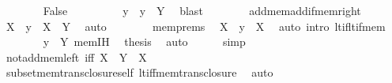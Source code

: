 \begin{isabellebody}
\ \ \ \ \ \ \isamarkupfalse%
\ False\isanewline
\ \ \ \ \ \ \isamarkupfalse%
\ \isamarkupfalse%
\ y\ \ {\isachardoublequoteopen}y\ {\isasymin}\ Y{\isachardoublequoteclose}\ \isamarkupfalse%
\ blast\isanewline
\ \ \ \ \ \ \isamarkupfalse%
\ add{\isacharunderscore}{\kern0pt}mem{\isacharunderscore}{\kern0pt}add{\isacharunderscore}{\kern0pt}if{\isacharunderscore}{\kern0pt}mem{\isacharunderscore}{\kern0pt}right\ \isamarkupfalse%
\ {\isachardoublequoteopen}X\ {\isacharplus}{\kern0pt}\ y\ {\isasymin}\ X\ {\isacharplus}{\kern0pt}\ Y{\isachardoublequoteclose}\ \isamarkupfalse%
\ auto\isanewline
\ \ \ \ \ \ \isamarkupfalse%
\ mem{\isachardot}{\kern0pt}prems\ \isamarkupfalse%
\ {\isachardoublequoteopen}X\ {\isacharplus}{\kern0pt}\ y\ {\isacharless}{\kern0pt}\ X{\isachardoublequoteclose}\ \isamarkupfalse%
\ {\isacharparenleft}{\kern0pt}auto\ intro{\isacharcolon}{\kern0pt}\ lt{\isacharunderscore}{\kern0pt}if{\isacharunderscore}{\kern0pt}lt{\isacharunderscore}{\kern0pt}if{\isacharunderscore}{\kern0pt}mem{\isacharparenright}{\kern0pt}\isanewline
\ \ \ \ \ \ \isamarkupfalse%
\ {\isacartoucheopen}y\ {\isasymin}\ Y{\isacartoucheclose}\ mem{\isachardot}{\kern0pt}IH\ \isamarkupfalse%
\ {\isacharquery}{\kern0pt}thesis\ \isamarkupfalse%
\ auto\isanewline
\ \ \ \ \isamarkupfalse%
\ simp\isanewline
\ \ \isamarkupfalse%
\isanewline
{}\isamarkupfalse%
%
\endisatagproof
{\isafoldproof}%
%
\isadelimproof
\isanewline
%
\endisadelimproof
\isanewline
{}\isamarkupfalse%
\ not{\isacharunderscore}{\kern0pt}add{\isacharunderscore}{\kern0pt}mem{\isacharunderscore}{\kern0pt}left\ {\isacharbrackleft}{\kern0pt}iff{\isacharbrackright}{\kern0pt}{\isacharcolon}{\kern0pt}\ {\isachardoublequoteopen}X\ {\isacharplus}{\kern0pt}\ Y\ {\isasymnotin}\ X{\isachardoublequoteclose}\isanewline
%
\isadelimproof
\ \ %
\endisadelimproof
%
\isatagproof
{}\isamarkupfalse%
\ subset{\isacharunderscore}{\kern0pt}mem{\isacharunderscore}{\kern0pt}trans{\isacharunderscore}{\kern0pt}closure{\isacharunderscore}{\kern0pt}self\ lt{\isacharunderscore}{\kern0pt}iff{\isacharunderscore}{\kern0pt}mem{\isacharunderscore}{\kern0pt}trans{\isacharunderscore}{\kern0pt}closure\ \isamarkupfalse%
\ auto%
\endisatagproof
{\isafoldproof}%
%
\isadelimproof
\isanewline
%
\endisadelimproof
\isanewline
{}\isamarkupfalse%

\end{isabellebody}
